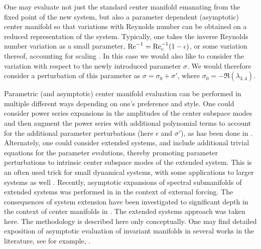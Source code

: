 One may evaluate not just the standard center manifold emanating from the fixed point of the new system, but also a parameter dependent (asymptotic) center manifold so that variations with Reynolds number can be obtained on a reduced representation of the system. Typically, one takes the inverse Reynolds number variation as a small parameter, $\mathrm{\mathrm{Re}^{-1}} = \mathrm{\mathrm{Re}_{c}^{-1}}(1 - \epsilon)$, or some variation thereof, accounting for scaling \citep{sipp07,carini15,negi24}. In this case we would also like to consider the variation with respect to the newly introduced parameter $\sigma$. We would therefore consider a perturbation of this parameter as $\sigma = \sigma_{0} + \sigma'$, where $\sigma_{0} = -\mathfrak{R}(\lambda_{3,4})$.

Parametric (and asymptotic) center manifold evaluation can be performed in multiple different ways depending on one's preference and style. One could consider power series expansions in the amplitudes of the center subspace modes and then augment the power series with additional polynomial terms to account for the additional parameter perturbations (here $\epsilon$  and $\sigma'$), as has been done in \cite{coullet83,carini15}. Alternately, one could consider extended systems, and include additional trivial equations for the parameter evolutions, thereby promoting parameter perturbations to intrinsic center subspace modes of the extended system. This is an often used trick for small dynamical systems, with some applications to larger systems as well \citep{mercer90,cox91,negi24,vizzaccaro24}. Recently, asymptotic expansions of spectral submanifolds of extended systems was performed in \cite{vizzaccaro24} in the context of external forcing. The consequences of system extension have been investigated to significant depth in the context of center manifolds in \cite{negi26}. The extended systems approach was taken here. The methodology is described here only conceptually. One may find detailed exposition of asymptotic evaluation of invariant manifolds in several works in the literature, see for example,  \cite{coullet83,roberts97,wiggins03,carini15,jain22,vizzaccaro24,negi24,negi26}.  

